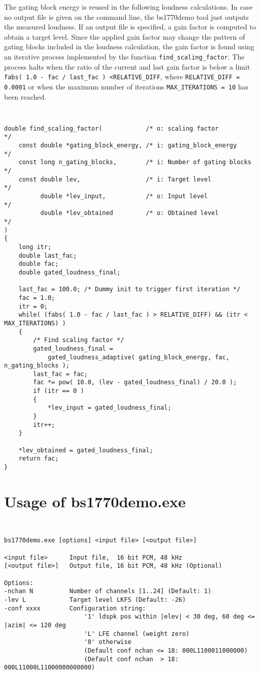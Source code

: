 The gating block energy is reused in the following loudness calculations. In case no output file is given on
the command line, the bs1770demo tool just outputs the measured loudness. If an output file is specified, a gain
factor is computed to obtain a target level. Since the applied gain factor may change the pattern of gating blocks
included in the loudness calculation, the gain factor is found using an iterative process implemented by the function
\texttt{find\_scaling\_factor}. The process halts when the ratio of the current and last gain factor is below a limit
\texttt{fabs( 1.0 - fac / last\_fac ) \textless RELATIVE\_DIFF}, where \texttt{RELATIVE\_DIFF = 0.0001} or when the maximum number of iterations \texttt{MAX\_ITERATIONS = 10}
has been reached.

{\tt\small
\begin{verbatim}
double find_scaling_factor(            /* o: scaling factor                 */
    const double *gating_block_energy, /* i: gating_block_energy            */
    const long n_gating_blocks,        /* i: Number of gating blocks        */
    const double lev,                  /* i: Target level                   */
          double *lev_input,           /* o: Input level                    */
          double *lev_obtained         /* o: Obtained level                 */
)
{
    long itr;
    double last_fac;
    double fac;
    double gated_loudness_final;

    last_fac = 100.0; /* Dummy init to trigger first iteration */
    fac = 1.0;
    itr = 0;
    while( (fabs( 1.0 - fac / last_fac ) > RELATIVE_DIFF) && (itr < MAX_ITERATIONS) )
    {
        /* Find scaling factor */
        gated_loudness_final = 
            gated_loudness_adaptive( gating_block_energy, fac, n_gating_blocks );
        last_fac = fac;
        fac *= pow( 10.0, (lev - gated_loudness_final) / 20.0 );
        if (itr == 0 )
        {
            *lev_input = gated_loudness_final;
        }
        itr++;
    }

    *lev_obtained = gated_loudness_final;
    return fac;
}
\end{verbatim}
}






\section{Usage of bs1770demo.exe}

{\tt\small
\begin{verbatim}
bs1770demo.exe [options] <input file> [<output file>]

<input file>      Input file,  16 bit PCM, 48 kHz
[<output file>]   Output file, 16 bit PCM, 48 kHz (Optional)

Options:
-nchan N          Number of channels [1..24] (Default: 1)
-lev L            Target level LKFS (Default: -26)
-conf xxxx        Configuration string:
                      '1' ldspk pos within |elev| < 30 deg, 60 deg <= |azim| <= 120 deg
                      'L' LFE channel (weight zero)
                      '0' otherwise
                      (Default conf nchan <= 18: 000L1100011000000)
                      (Default conf nchan  > 18: 000L11000L11000000000000)
\end{verbatim}
}